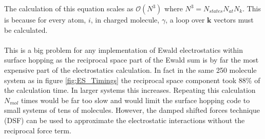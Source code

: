 \noindent The calculation of this equation scales as $\mathcal{O}(N^3)$ where $N^3 = N_{states} N_{at} N_{k}$. This   is because for every atom, $i$, in charged molecule, $\gamma$, a loop over $\mathbf{k}$ vectors must be calculated.   
\\\\
This is a big problem for any implementation of Ewald electrostatics within surface hopping as the reciprocal space part of the Ewald sum is by far the most expensive part of the electrostatics calculation. In fact in the same 250 molecule system as in figure \ref{fig:ES_Timings} the reciprocal space component took 88\% of the calculation time. In larger systems this increases. Repeating this calculation $N_{mol}$ times would be far too slow and would limit the surface hopping code to small systems of tens of molecules. However, the damped shifted forces technique (DSF) \cite{DSF} can be used to approximate the electrostatic interactions without the reciprocal force term. 
